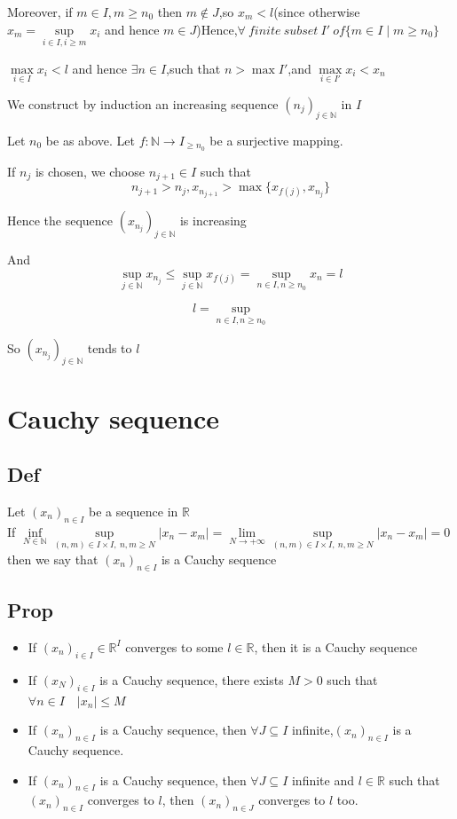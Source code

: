\documentclass{book}
\begin{document}
Moreover, if $m\in I,m\geq n_0$ then $m\not\in J$,so $x_m<l$(since otherwise $x_m=\sup\limits_{i\in I,i\geq m}x_i$ and hence $m\in J$)Hence,$\forall\ finite\ subset\ I'\ of\{m\in I\mid m\geq n_0\}$

$\max\limits_{i\in I}x_i<l$ and hence $\exists n\in I$,such that $n>\max I'$,and $\max\limits_{i\in I'}x_i<x_n$

We construct by induction an increasing sequence $(n_j)_{j\in \mathbb{N} }$ in $I$

Let $n_0$ be as above. Let $f:\mathbb{N} \rightarrow I_{\geq n_0}$ be a surjective mapping.

If $n_j$ is chosen, we choose $n_{j+1}\in I$ such that $$n_{j+1}>n_j, x_{n_{j+1}}>\max\{x_{f(j)},x_{n_j}\}$$

Hence the sequence $(x_{n_j})_{j\in \mathbb{N} }$ is increasing

And $$\sup\limits_{j\in \mathbb{N} }x_{n_j}\leq\sup\limits_{j\in\mathbb{N} }x_{f(j)}=\sup\limits_{n\in I,n\geq n_0}x_n=l$$

$$l=\sup\limits_{n\in I,n\geq n_0}$$
 
So $(x_{n_j})_{j\in\mathbb{N} }$ tends to $l$
\chapter{Cauchy sequence}
\section{Def}
Let $(x_n)_{n\in I}$ be a sequence in $\mathbb{R} $\\
If $\inf\limits_{N\in \mathbb{N} }\sup\limits_{(n,m)\in I\times I,\ n,m\geq N}\lvert x_n-x_m\rvert=\lim\limits_{N\rightarrow+\infty}\sup\limits_{(n,m)\in I\times I,\ n,m\geq N}\lvert x_n-x_m\rvert=0$ then we say that $(x_n)_{n\in I}$ is a Cauchy sequence
\section{Prop}
\begin{itemize}
    \item If $(x_n)_{i\in I}\in \mathbb{R} ^I$ converges to some $l\in \mathbb{R} $, then it is a Cauchy sequence
    \item If $(x_N)_{i\in I}$ is a Cauchy sequence, there exists $M>0$ such that $ \forall n\in I\quad \lvert x_n\rvert\leq M$
    \item If $(x_n)_{n\in I}$ is a Cauchy sequence, then $\forall J\subseteq I$ infinite,$(x_n)_{n\in I}$ is a Cauchy sequence.
    \item If $(x_n)_{n\in I}$ is a Cauchy sequence, then $\forall J\subseteq I$ infinite and $l\in \mathbb{R} $ such that $(x_n)_{n\in I}$ converges to $l$, then $(x_n)_{n\in J}$ converges to $l$ too.
\end{itemize}
\end{document}
